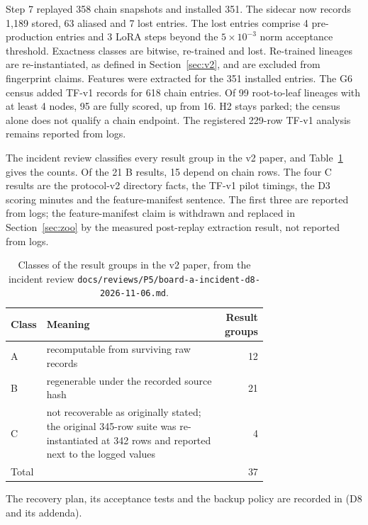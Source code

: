 Step 7 replayed 358 chain snapshots and installed 351. The sidecar now records 1,189 stored, 63 aliased and 7 lost entries. The lost entries comprise 4 pre-production entries and 3 LoRA steps beyond the $5\times10^{-3}$ norm acceptance threshold. Exactness classes are bitwise, re-trained and lost. Re-trained lineages are re-instantiated, as defined in Section~\ref{sec:v2}, and are excluded from fingerprint claims. Features were extracted for the 351 installed entries. The G6 census added TF-v1 records for 618 chain entries. Of 99 root-to-leaf lineages with at least 4 nodes, 95 are fully scored, up from 16. H2 stays parked; the census alone does not qualify a chain endpoint. The registered 229-row TF-v1 analysis remains reported from logs.

The incident review classifies every result group in the v2 paper, and Table~\ref{tab:d8-classes} gives the counts. Of the 21 B results, 15 depend on chain rows. The four C results are the protocol-v2 directory facts, the TF-v1 pilot timings, the D3 scoring minutes and the feature-manifest sentence. The first three are reported from logs; the feature-manifest claim is withdrawn and replaced in Section~\ref{sec:zoo} by the measured post-replay extraction result, not reported from logs.

\begin{table}[t]
\centering
\small
\begin{tabular}{l>{\raggedright\arraybackslash}p{0.72\linewidth}r}\toprule
Class & Meaning & Result groups \\\midrule
A & recomputable from surviving raw records & 12 \\
B & regenerable under the recorded source hash & 21 \\
C & not recoverable as originally stated; the original 345-row suite was re-instantiated at 342 rows and reported next to the logged values & 4 \\\midrule
Total & & 37 \\\bottomrule
\end{tabular}
\caption{Classes of the result groups in the v2 paper, from the incident review \texttt{docs/reviews/P5/board-a-incident-d8-2026-11-06.md}.}
\label{tab:d8-classes}
\end{table}

The recovery plan, its acceptance tests and the backup policy are recorded in  (D8 and its addenda).

